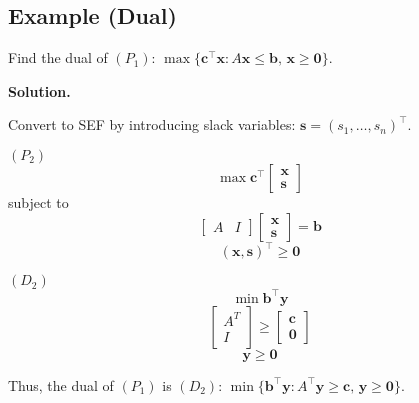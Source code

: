 \subsection{Example (Dual)}
Find the dual of
$ (P_1)$: $\max \{\bm{c}^\top \bm{x}: A \bm{x}\le \bm{b},\,\bm{x}\ge \bm{0}\}$.

\textbf{Solution.}

Convert to SEF by introducing slack variables: $ \bm{s}=(s_1,\ldots,s_n)^\top $.

$ (P_2) $
\[ \max \bm{c}^\top
\begin{bmatrix}
    \bm{x}\\
    \bm{s}
\end{bmatrix} \]
subject to
\[ \left[ \begin{array}{c|c}
    A & I
\end{array} \right]
\begin{bmatrix}
    \bm{x}\\
    \bm{s}
\end{bmatrix} = \bm{b} \]
\[ (\bm{x},\bm{s})^\top\ge \bm{0} \]

$ (D_2) $
\[ \min \bm{b}^\top \bm{y} \]
\[ \begin{bmatrix}
    A^T\\
    I
\end{bmatrix} \ge
\begin{bmatrix}
    \bm{c}\\
    \bm{0}
\end{bmatrix}\]
\[ \bm{y}\ge \bm{0} \]

Thus, the dual of $ (P_1) $ is $ (D_2) $: 
$\min\{\bm{b}^\top \bm{y}: A ^\top \bm{y}\ge \bm{c},\,\bm{y}\ge \bm{0}\}$.
